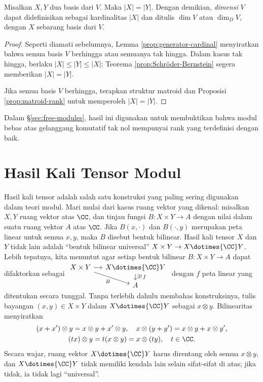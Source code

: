 \begin{definition-theorem}\label{def:dimension-vector-space}
	Misalkan $X, Y$ dua basis dari $V$. Maka $|X|=|Y|$. Dengan demikian, \emph{dimensi} $V$ dapat didefinisikan sebagai kardinalitas $|X|$ dan ditulis $\dim V$ atau $\dim_D V$, dengan $X$ sebarang basis dari $V$.
\end{definition-theorem}
\begin{proof}
	Seperti diamati sebelumnya, Lemma \ref{prop:generator-cardinal} menyiratkan bahwa semua basis $V$ berhingga atau semuanya tak hingga. Dalam kasus tak hingga, berlaku $|X| \leq |Y| \leq |X|$; Teorema \ref{prop:Schröder-Bernstein} segera memberikan $|X|=|Y|$.

	Jika semua basis $V$ berhingga, terapkan struktur matroid dan Proposisi \ref{prop:matroid-rank} untuk memperoleh $|X|=|Y|$.
\end{proof}
Dalam \S\ref{sec:free-modules}, hasil ini digunakan untuk membuktikan bahwa modul bebas atas gelanggang komutatif tak nol mempunyai rank yang terdefinisi dengan baik.
 
\section{Hasil Kali Tensor Modul}\label{sec:module-tensor-prod}
Hasil kali tensor adalah salah satu konstruksi yang paling sering digunakan dalam teori modul. Mari mulai dari kasus ruang vektor yang dikenal: misalkan $X, Y$ ruang vektor atas $\CC$, dan tinjau fungsi $B: X \times Y \to A$ dengan nilai dalam suatu ruang vektor $A$ atas $\CC$. Jika $B(x, \cdot)$ dan $B(\cdot, y)$ merupakan peta linear untuk semua $x,y$, maka $B$ disebut bentuk bilinear. Hasil kali tensor $X$ dan $Y$ tidak lain adalah ``bentuk bilinear universal'' $X \times Y \to X \dotimes{\CC} Y$. Lebih tepatnya, kita menuntut agar setiap bentuk bilinear $B: X \times Y \to A$ dapat difaktorkan sebagai
$\begin{tikzcd}[row sep=small, column sep=small]
	X \times Y \arrow[r] \arrow[rd, "B"'] & X \dotimes{\CC} Y \arrow[d, "\exists! \, f"] \\
	& A
\end{tikzcd}$
dengan $f$ peta linear yang ditentukan secara tunggal. Tanpa terlebih dahulu membahas konstruksinya, tulis bayangan $(x,y) \in X \times Y$ dalam $X \dotimes{\CC} Y$ sebagai $x \otimes y$. Bilinearitas menyiratkan
\begin{gather*}
	(x+x') \otimes y = x \otimes y + x' \otimes y, \quad x \otimes (y+y') = x \otimes y + x \otimes y', \\
	(tx) \otimes y = t(x \otimes y) = x \otimes (ty), \quad t \in \CC.
\end{gather*}
Secara wajar, ruang vektor $X \dotimes{\CC} Y$ harus direntang oleh semua $x \otimes y$, dan $X \dotimes{\CC} Y$ tidak memiliki kendala lain selain sifat-sifat di atas; jika tidak, ia tidak lagi ``universal''.

